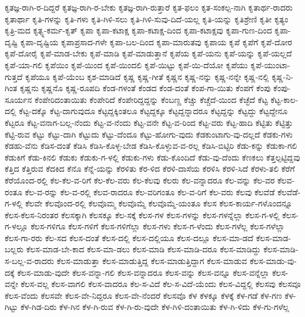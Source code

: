 ಕೃತಜ್ಞ-ರಾಗಿ-ರ-ದಿದ್ದರೆ
ಕೃತಜ್ಞ-ರಾಗಿ-ರ-ಬೇಕು
ಕೃತಜ್ಞ-ರಾಗಿ-ರುತ್ತಾರೆ
ಕೃತ-ಫಲಂ
ಕೃತ-ಸಂಕಲ್ಪ-ನಾಗಿ
ಕೃತಾರ್ಥ-ರಾದರು
ಕೃತಾರ್ಥಾ
ಕೃತಿ-ಗಳನ್ನು
ಕೃತಿ-ಗಳು
ಕೃತಿ-ಗಿಳಿ-ಸಲು
ಕೃತಿ-ಗಿಳಿ-ಸುವು-ದಿದೆ-ಯಲ್ಲ
ಕೃತಿ-ಯನ್ನು
ಕೃತಿಶ್ರೇಣಿ
ಕೃತೀ
ಕೃತ್ಯಂ
ಕೃತ್ರಿ-ಮದ
ಕೃತ್ಸ್ನ-ಕರ್ಮ-ಕೃತ್
ಕೃಪಾ
ಕೃಪಾ-ಕಟಾಕ್ಷ
ಕೃಪಾ-ಕಟಾಕ್ಷ-ದಿಂದ
ಕೃಪಾ-ಕಟಾಕ್ಷವು
ಕೃಪಾ-ಗುಣ-ದಿಂದ
ಕೃಪಾ-ದೃಷ್ಟಿ
ಕೃಪಾ-ದೃಷ್ಟಿಯ
ಕೃಪಾಪ್ರಸಾದ-ಗಳೇ
ಕೃಪಾ-ಬಲ-ದಿಂದ
ಕೃಪಾ-ಮಾರುತವು
ಕೃಪಾಯ
ಕೃಪೆ
ಕೃಪೆಗೆ
ಕೃಪೆ-ದೋರ
ಕೃಪೆ-ದೋರೈ
ಕೃಪೆ-ಮಾಡ-ಬೇಕು
ಕೃಪೆ-ಮಾಡಿ
ಕೃಪೆ-ಮಾಡುತ್ತಾನೆ
ಕೃಪೆಯ
ಕೃಪೆ-ಯನು
ಕೃಪೆ-ಯನ್ನು
ಕೃಪೆ-ಯಲ್ಲದೆ
ಕೃಪೆ-ಯಾ-ಗಲಿ
ಕೃಪೆಯಿಂ
ಕೃಪೆ-ಯಿಂದ
ಕೃಪೆ-ಯಿಂದಲಿ
ಕೃಪೆ-ಯಿಟ್ಟು
ಕೃಪೆ-ಯಿ-ದೆಯೋ
ಕೃಪೆಯು
ಕೃಪೆ-ಯುಂಟಾ-ಗುತ್ತದೆ
ಕೃಪೆಯೂ
ಕೃಪೆ-ಯೆಂಬ
ಕೃಶ-ಮಾಡಿದೆ
ಕೃಷ್ಣ
ಕೃಷ್ಣ-ಗೀತೆ
ಕೃಷ್ಣನ
ಕೃಷ್ಣ-ನನ್ನು
ಕೃಷ್ಣ-ನನ್ನೇ
ಕೃಷ್ಣ-ನಲ್ಲಿ
ಕೃಷ್ಣ-ನಿ-ಗಿಂತ
ಕೃಷ್ಣನು
ಕೃಷ್ಣನೊ
ಕೃಷ್ಣ-ರೂಪದಿ
ಕೆಂಡ-ಗಳಂತೆ
ಕೆಂಡದ
ಕೆಂಡ-ದಂತೆ
ಕೆಂಪ-ಗಾ-ಯಿತು
ಕೆಂಪಗೆ
ಕೆಂಪು
ಕೆಂಪು-ಸೂರ್ಯನ
ಕೆಂಪೇರಿದಂತಾಯಿತು
ಕೆಂಪೇರಿದೆ
ಕೆಂಪೇರಿದ್ದದ್ದನ್ನು
ಕೆಂಬಣ್ಣ
ಕೆಚ್ಚು
ಕೆಚ್ಚೆದೆ-ಯಿಂದ
ಕೆಚ್ಛೆದೆ
ಕೆಟ್ಟ
ಕೆಟ್ಟ-ಕಾಲ-ದಲ್ಲಿ
ಕೆಟ್ಟ-ದಕ್ಕೊ
ಕೆಟ್ಟ-ದಾಗುವುದೂ
ಕೆಟ್ಟದ್ದಕ್ಕಿಂತಲೂ
ಕೆಟ್ಟದ್ದಕ್ಕೂ
ಕೆಟ್ಟದ್ದನ್ನಾದರೂ
ಕೆಟ್ಟದ್ದನ್ನು
ಕೆಟ್ಟದ್ದು
ಕೆಟ್ಟದ್ದೇನೂ
ಕೆಟ್ಟರೂ
ಕೆಟ್ಟ-ವನಾಗ-ಬಲ್ಲ-ನೆಂದು
ಕೆಟ್ಟ-ವ-ನೆಂದು
ಕೆಟ್ಟ-ವನೇ
ಕೆಟ್ಟ-ವ-ರಿಂದ
ಕೆಟ್ಟ-ವರು
ಕೆಟ್ಟ-ಹಾದಿ
ಕೆಟ್ಟಿತು
ಕೆಟ್ಟಿತ್ತು
ಕೆಟ್ಟಿ-ರುವ
ಕೆಟ್ಟು
ಕೆಟ್ಟು-ದಾಗಿ
ಕೆಟ್ಟುದು
ಕೆಟ್ಟು-ದೆಂದೂ
ಕೆಟ್ಟು-ಹೋಗು-ವುದು
ಕೆಡಕುಂಟಾಗು-ವು-ದಲ್ಲದೆ
ಕೆಡಕು-ಗಳು
ಕೆಡಹು-ವೆನು
ಕೆಡಿಸ-ದಂತೆ
ಕೆಡಿಸಿ
ಕೆಡಿಸಿ-ಕೊಳ್ಳ-ಬೇಡ
ಕೆಡಿಸಿ-ಕೊಳ್ಳುವ-ವ-ರಲ್ಲ
ಕೆಡಿಸಿ-ಬಿಟ್ಟಿರಿ
ಕೆಡು-ಕನ್ನು
ಕೆಡುಕಾ-ಗಲಿ
ಕೆಡುಕಿಗೆ
ಕೆಡು-ಕಿನಲಿ
ಕೆಡುಕು
ಕೆಡುಕು-ಗ-ಳಲ್ಲಿ
ಕೆಡುಕು-ಗಳು
ಕೆಡು-ಕೊಂದಿದೆ
ಕೆಡು-ವು-ದೆಂದು
ಕೆಣಕಲು
ಕೆತ್ತಲ್ಪಟ್ಟಿದ್ದವು
ಕೆತ್ತಿದ
ಕೆತ್ತಿರುವ
ಕೆದಕಿದ
ಕೆನೊ
ಕೆನ್ನೆ-ಯನ್ನು
ಕೆರಳಿತು
ಕೆರ-ಳಿದ
ಕೆರಳಿ-ದಾಸೆಯ
ಕೆರಳಿಸಿ
ಕೆರಳಿ-ಸಿದೆ
ಕೆರಳು-ತಲಿ
ಕೆರೆಗೆ
ಕೆರೆಯೊಂದ-ರಲ್ಲಿ
ಕೆಲ-ಕೆಲ-ವ-ರಿಗೆ
ಕೆಲ-ಕೆಲ-ವರು
ಕೆಲ-ಕೆಲವು
ಕೆಲರು
ಕೆಲ-ವನ್ನಾದರೂ
ಕೆಲ-ವನ್ನು
ಕೆಲ-ವರ
ಕೆಲವ-ರಂತೂ
ಕೆಲ-ವ-ರನ್ನು
ಕೆಲ-ವ-ರಲ್ಲಿ
ಕೆಲವ-ರಾದರೂ
ಕೆಲ-ವರಿಗಂತೂ
ಕೆಲ-ವ-ರಿಗೆ
ಕೆಲ-ವರು
ಕೆಲವು
ಕೆಲವೆಡೆ
ಕೆಲವೆಡೆ-ಗ-ಳಲ್ಲಿ
ಕೆಲವೇ
ಕೆಲವೊಂದ-ರಲ್ಲಿ
ಕೆಲವೊಮ್ಮ
ಕೆಲವೊಮ್ಮೆ
ಕೆಲವೊಮ್ಮೆ-ಯಂತೂ
ಕೆಲಸ
ಕೆಲಸ-ಕಾರ್ಯ-ಗಳೊಂದನ್ನೂ
ಕೆಲಸ-ಕೆಲಸ-ನಿರಂತರ
ಕೆಲಸಕ್ಕಾಗಿ
ಕೆಲಸಕ್ಕೂ
ಕೆಲ-ಸಕ್ಕೆ
ಕೆಲಸ-ಗಳ
ಕೆಲಸ-ಗಳನ್ನು
ಕೆಲಸ-ಗಳನ್ನೆಲ್ಲಾ
ಕೆಲಸ-ಗ-ಳಲ್ಲಿ
ಕೆಲಸ-ಗ-ಳಲ್ಲೂ
ಕೆಲಸ-ಗಳಿಗೂ
ಕೆಲಸ-ಗಳಿಗೆ
ಕೆಲಸ-ಗಳಿಗೆಲ್ಲಾ
ಕೆಲಸ-ಗಳು
ಕೆಲಸ-ಗ-ಳೆಂದು
ಕೆಲಸ-ಗಳೆಲ್ಲ
ಕೆಲಸ-ಗಳೆಲ್ಲಾ
ಕೆಲಸ-ಗಾ-ರರು
ಕೆಲ-ಸದ
ಕೆಲಸ-ದಂತೆ
ಕೆಲಸ-ದಲ್ಲಿ
ಕೆಲಸ-ದಲ್ಲಿಯೂ
ಕೆಲಸ-ದಲ್ಲೂ
ಕೆಲಸ-ಮಾ-ಡದೆ
ಕೆಲಸ-ಮಾಡ-ಬಲ್ಲರು
ಕೆಲಸ-ಮಾಡ-ಬೇ-ಕಾದ
ಕೆಲಸ-ಮಾ-ಡಲು
ಕೆಲಸ-ಮಾಡಿ
ಕೆಲಸ-ಮಾಡಿ-ದರೂ
ಕೆಲಸ-ಮಾಡಿದ್ದು
ಕೆಲಸ-ಮಾಡಿ-ಸ-ಬಲ್ಲ-ವ-ರಾದರು
ಕೆಲಸ-ಮಾಡುತ್ತಾ
ಕೆಲಸ-ಮಾಡುತ್ತಿದ್ದ
ಕೆಲಸ-ಮಾಡುತ್ತಿದ್ದಾಗ
ಕೆಲಸ-ಮಾಡುವ
ಕೆಲಸ-ಮಾಡು-ವು-ದಕ್ಕೆ
ಕೆಲಸ-ಮಾಡು-ವುದೇ
ಕೆಲಸ-ವನ್ನಾ-ಗಲಿ
ಕೆಲಸ-ವನ್ನಾದರೂ
ಕೆಲಸ-ವನ್ನು
ಕೆಲಸ-ವನ್ನೂ
ಕೆಲಸ-ವನ್ನೆಲ್ಲಾ
ಕೆಲಸ-ವನ್ನೇ
ಕೆಲಸ-ವಲ್ಲ
ಕೆಲಸ-ವಾಗಲಿ
ಕೆಲಸ-ವಾದರೂ
ಕೆಲ-ಸ-ವಿದೆ
ಕೆಲ-ಸ-ವಿದೆ-ಯೆಂದು
ಕೆಲಸ-ವಿದ್ದಲ್ಲಿ
ಕೆಲಸವು
ಕೆಲಸವೂ
ಕೆಲಸ-ವೆಂದು
ಕೆಲಸವೇ
ಕೆಲಸ-ವೇ-ನಿದ್ದರೂ
ಕೆಲಸ-ವೇ-ನೆಂದರೆ
ಕೆಲಸವೊ
ಕೆಳ
ಕೆಳಕ್ಕೂ
ಕೆಳಕ್ಕೆ
ಕೆಳ-ಗಡೆ
ಕೆಳ-ಗಣ
ಕೆಳ-ಗಿಟ್ಟು
ಕೆಳ-ಗಿಡ-ದಿರು
ಕೆಳ-ಗಿನ
ಕೆಳ-ಗಿ-ರುವ
ಕೆಳ-ಗಿ-ರು-ವುದೇ
ಕೆಳ-ಗಿಳಿ-ದಂತಾಯಿತು
ಕೆಳ-ಗಿ-ಳಿದು
ಕೆಳ-ಗು-ಗಳೆಲ್ಲ
